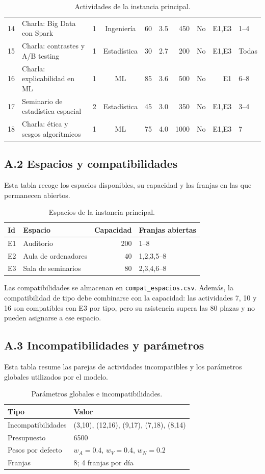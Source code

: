 \begin{table}[htbp]
{\begin{tabular}{rlccrrrrrl}
14 & Charla: Big Data con Spark & 1 & Ingeniería & 60 & 3.5 & 450 & No & E1,E3 & 1--4 \\
15 & Charla: contrastes y A/B testing & 1 & Estadística & 30 & 2.7 & 200 & No & E1,E3 & Todas \\
16 & Charla: explicabilidad en ML & 1 & ML & 85 & 3.6 & 500 & No & E1 & 6--8 \\
17 & Seminario de estadística espacial & 2 & Estadística & 45 & 3.0 & 350 & No & E1,E3 & 3--4 \\
18 & Charla: ética y sesgos algorítmicos & 1 & ML & 75 & 4.0 & 1000 & No & E1,E3 & 7 \\
\bottomrule
\end{tabular}%
}
\caption{Actividades de la instancia principal.}
\end{table}

\subsection*{A.2 Espacios y compatibilidades}
Esta tabla recoge los espacios disponibles, su capacidad y las franjas en las
que permanecen abiertos.
\begin{table}[htbp]
\centering
\begin{tabular}{llrl}
\toprule
Id & Espacio & Capacidad & Franjas abiertas \\
\midrule
E1 & Auditorio & 200 & 1--8 \\
E2 & Aula de ordenadores & 40 & 1,2,3,5--8 \\
E3 & Sala de seminarios & 80 & 2,3,4,6--8 \\
\bottomrule
\end{tabular}
\caption{Espacios de la instancia principal.}
\end{table}

Las compatibilidades se almacenan en \texttt{compat\_espacios.csv}. Además,
la compatibilidad de tipo debe combinarse con la capacidad: las actividades
7, 10 y 16 son compatibles con E3 por tipo, pero su asistencia supera las
80 plazas y no pueden asignarse a ese espacio.

\subsection*{A.3 Incompatibilidades y parámetros}
Esta tabla resume las parejas de actividades incompatibles y los parámetros
globales utilizados por el modelo.
\begin{table}[htbp]
\centering
\begin{tabular}{ll}
\toprule
Tipo & Valor \\
\midrule
Incompatibilidades & (3,10), (12,16), (9,17), (7,18), (8,14) \\
Presupuesto & 6500 \\
Pesos por defecto & $w_A=0.4$, $w_V=0.4$, $w_N=0.2$ \\
Franjas & 8; 4 franjas por día \\
\bottomrule
\end{tabular}
\caption{Parámetros globales e incompatibilidades.}
\end{table}

